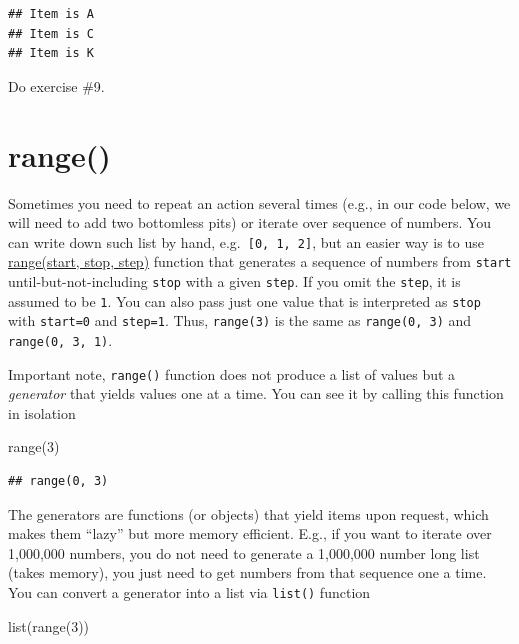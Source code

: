 \documentclass[
]{book}
\newenvironment{Shaded}{\begin{snugshade}}{\end{snugshade}}
\newcommand{\BuiltInTok}[1]{#1}
\newcommand{\DecValTok}[1]{\textcolor[rgb]{0.00,0.00,0.81}{#1}}
\newcommand{\NormalTok}[1]{#1}
\begin{document}
\begin{verbatim}
## Item is A
## Item is C
## Item is K
\end{verbatim}

Do exercise \#9.

\hypertarget{range}{%
\section{range()}\label{range}}

Sometimes you need to repeat an action several times (e.g., in our code below, we will need to add two bottomless pits) or iterate over sequence of numbers. You can write down such list by hand, e.g.~\texttt{{[}0,\ 1,\ 2{]}}, but an easier way is to use \href{https://docs.python.org/3/library/stdtypes.html\#range}{range(start, stop, step)} function that generates a sequence of numbers from \texttt{start} until-but-not-including \texttt{stop} with a given \texttt{step}. If you omit the \texttt{step}, it is assumed to be \texttt{1}. You can also pass just one value that is interpreted as \texttt{stop} with \texttt{start=0} and \texttt{step=1}. Thus, \texttt{range(3)} is the same as \texttt{range(0,\ 3)} and \texttt{range(0,\ 3,\ 1)}.

Important note, \texttt{range()} function does not produce a list of values but a \emph{generator} that yields values one at a time. You can see it by calling this function in isolation

\begin{Shaded}
\begin{Highlighting}[]
\BuiltInTok{range}\NormalTok{(}\DecValTok{3}\NormalTok{)}
\end{Highlighting}
\end{Shaded}

\begin{verbatim}
## range(0, 3)
\end{verbatim}

The generators are functions (or objects) that yield items upon request, which makes them ``lazy'' but more memory efficient. E.g., if you want to iterate over 1,000,000 numbers, you do not need to generate a 1,000,000 number long list (takes memory), you just need to get numbers from that sequence one a time. You can convert a generator into a list via \texttt{list()} function

\begin{Shaded}
\begin{Highlighting}[]
\BuiltInTok{list}\NormalTok{(}\BuiltInTok{range}\NormalTok{(}\DecValTok{3}\NormalTok{))}
\end{Highlighting}
\end{Shaded}
\end{document}
